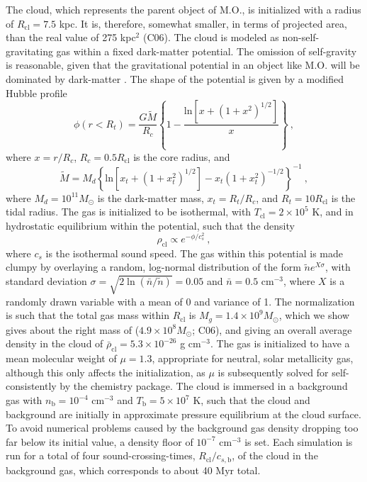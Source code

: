 \documentclass{aastex6}
\begin{document}
The cloud, which represents the parent object of M.O., is initialized with a radius of $R_\mathrm{cl} = 7.5$ kpc.  It is, therefore, somewhat smaller, in terms of projected area, than the real value of 275 kpc$^2$ (C06). The cloud is modeled as non-self-gravitating gas within a fixed 
dark-matter potential.  The omission of self-gravity is reasonable, given that the gravitational potential in an object like M.O. will be dominated by dark-matter \citep{Persic96}. The shape of the potential is given by a modified Hubble profile \citep{Binney87}
\begin{equation}
\phi(r<R_t) = \frac{G \tilde{M}}{R_c} \left\{ 1 - \frac{\mbox{ln}
[x + (1+x^2)^{1/2}]}{x} \right\} ~,
\end{equation}
where $x=r/R_c$, $R_c = 0.5 R_\mathrm{cl}$ is the core radius, and
\begin{equation}
\tilde{M} = M_d \left\{ \mbox{ln}[x_t +(1+x_t^2)^{1/2}] - 
x_t(1+x_t^2)^{-1/2} \right\}^{-1} ~,
\end{equation}
where $M_d = 10^{11} M_\odot$ is the dark-matter mass, $x_t=R_t/R_c$, and $R_t = 10 R_\mathrm{cl}$ is the tidal radius. %
The gas is initialized to be isothermal, with $T_\mathrm{cl} = 2 \times 10^5$ K, and in hydrostatic equilibrium within the potential, such that the density
\begin{equation}
\rho_\mathrm{cl} \propto e^{-\phi/c_s^2} ~,
\label{eqn:densitylaw}
\end{equation}
where $c_s$ is the isothermal sound speed. The gas within this potential is made clumpy by overlaying a random, log-normal distribution of the form $\tilde{n} e^{X\sigma}$, with standard deviation $\sigma = \sqrt{2 \ln (\bar{n}/\tilde{n})}=0.05$ and $\bar{n} = 0.5$ cm$^{-3}$, where $X$ is a randomly drawn variable with a mean of 0 and variance of 1. The normalization is such that the total gas mass within $R_\mathrm{cl}$ is $M_g = 1.4 \times 10^9 M_\odot$, which we show gives about the right mass of  ($4.9 \times 10^8 M_\odot$; C06), and giving an overall average density in the cloud of $\bar{\rho}_\mathrm{cl} = 5.3 \times 10^{-26}$ g cm$^{-3}$. The gas is initialized to have a mean molecular weight of $\mu = 1.3$, appropriate for neutral, solar metallicity gas, although this only affects the initialization, as $\mu$ is subsequently solved for self-consistently by the chemistry package. The cloud is immersed in a background gas with $n_\mathrm{b} = 10^{-4}$ cm$^{-3}$ and $T_\mathrm{b} = 5 \times 10^{7}$ K, such that the cloud and background are initially in approximate pressure equilibrium at the cloud surface. To avoid numerical problems caused by the background gas density dropping too far below its initial value, a density floor of $10^{-7}$ cm$^{-3}$ is set. Each simulation is run for a total of four sound-crossing-times, $R_\mathrm{cl}/c_{s,\mathrm{b}}$, of the cloud in the background gas, which corresponds to about 40 Myr total.
\end{document}
